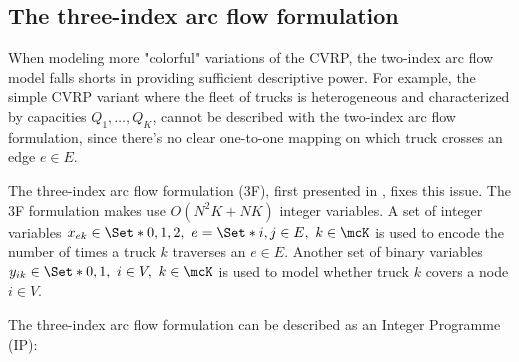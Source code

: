 \subsection{The three-index arc flow formulation}
\label{sec:intro-cvrp-three-index-flow-formulation}

When modeling more "colorful" variations of the CVRP, the two-index arc flow model falls shorts in providing sufficient descriptive power.
For example, the simple CVRP variant where the fleet of trucks is heterogeneous and characterized by capacities $Q_1, \dots, Q_K$,
cannot be described with the two-index arc flow formulation, since there's no clear one-to-one mapping on which truck crosses an edge $e \in E$.

The three-index arc flow formulation (3F), first presented in \textcite{golden1977}, fixes this issue.
The 3F formulation makes use $O(N^2 K + N K)$ integer variables.
A set of integer variables $x_{ek} \in \Set*{0, 1, 2},\ e = \Set*{i, j} \in E,\ k \in \mcK$ is used to encode the number of times a truck $k$ traverses an $e \in E$.
Another set of binary variables $y_{ik} \in \Set*{0, 1},\ i \in V,\ k \in \mcK$ is used to model whether truck $k$ covers a node $i \in V$.


The three-index arc flow formulation can be described as an Integer Programme (IP):


